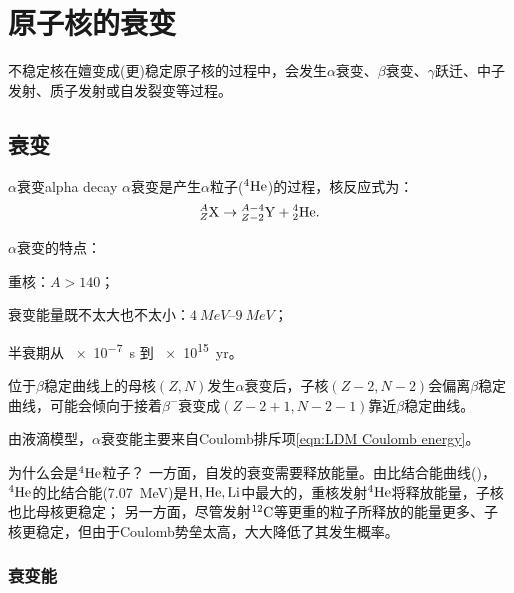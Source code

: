 \chapter{原子核的衰变}
不稳定核在嬗变成(更)稳定原子核的过程中，会发生$\alpha$衰变、$\beta$衰变、$\gamma$跃迁、中子发射、质子发射或自发裂变等过程。

\section{\alpharay 衰变}

\begin{definition}
	{$\alpha$衰变}{alpha decay}
	$\alpha$衰变是产生$\alpha$粒子($\nuclide{4}{He}$)的过程，核反应式为：
	\begin{equation}
		\nuclide[Z]{A}{X} \to \nuclide[Z - 2]{A - 4}{Y} + \nuclide[2]{4}{He}.
	\end{equation}
\end{definition}

\begin{remark}
	$\alpha$衰变的特点：
	\begin{compactenum}
		\item 重核：$A > 140$；
		\item 衰变能量既不太大也不太小：$\qtyrange{4}{9}{MeV}$；
		\item 半衰期从 \qty{e-7}{s} 到 \qty{e15}{yr}。
		\item 位于$\beta$稳定曲线上的母核$(Z,N)$发生$\alpha$衰变后，子核$(Z - 2,N - 2)$会偏离$\beta$稳定曲线，可能会倾向于接着$\beta^-$衰变成$(Z - 2 + 1,N - 2 - 1)$靠近$\beta$稳定曲线。
	\end{compactenum}
\end{remark}

\begin{corollary}
	由液滴模型，$\alpha$衰变能主要来自Coulomb排斥项\eqref{eqn:LDM Coulomb energy}。
\end{corollary}

\begin{remark}
	为什么会是$\nuclide{4}{He}$粒子？
	一方面，自发的衰变需要释放能量。由比结合能曲线()，$\nuclide{4}{He}$的比结合能(\qty{7.07}{MeV})是$\mathrm{H},\mathrm{He},\mathrm{Li}$中最大的，重核发射$\nuclide4{He}$将释放能量，子核也比母核更稳定；
	另一方面，尽管发射$\nuclide{12}C$等更重的粒子所释放的能量更多、子核更稳定，但由于Coulomb势垒太高，大大降低了其发生概率。
\end{remark}

\subsection{\alpharay 衰变能}

